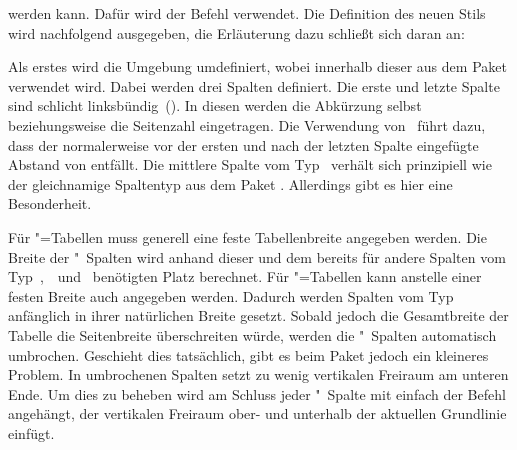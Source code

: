 \documentclass[%
  english,ngerman,%
  geometry=no,DIV=12,automark,%
]{tudscrartcl}
\begin{document}
werden kann. Dafür wird der Befehl  verwendet. Die 
Definition des neuen Stils  wird nachfolgend ausgegeben, 
die Erläuterung dazu schließt sich daran an:
%
\TutorialHook{\let\newglossarystyle\renewglossarystyle}
\begin{Tutorial}
\end{Tutorial}
%
Als erstes wird die Umgebung  umdefiniert, wobei 
innerhalb dieser  aus dem Paket  verwendet 
wird. Dabei werden drei Spalten definiert. Die erste und letzte Spalte sind 
schlicht linksbündig~(). In diesen werden die Abkürzung selbst 
beziehungsweise die Seitenzahl eingetragen. Die Verwendung von~ 
führt dazu, dass der normalerweise vor der ersten und nach der letzten Spalte 
eingefügte Abstand von  entfällt. Die mittlere Spalte vom 
Typ~ verhält sich prinzipiell wie der gleichnamige Spaltentyp aus dem 
Paket . Allerdings gibt es hier eine Besonderheit.

Für "=Tabellen muss generell eine feste Tabellenbreite 
angegeben werden. Die Breite der "~Spalten wird anhand dieser und 
dem bereits für andere Spalten vom Typ~,~~und~ 
benötigten Platz berechnet. Für "=Tabellen kann anstelle 
einer festen Breite auch  angegeben werden. Dadurch werden 
Spalten vom Typ~ anfänglich in ihrer natürlichen Breite gesetzt. 
Sobald jedoch die Gesamtbreite der Tabelle die Seitenbreite überschreiten 
würde, werden die "~Spalten automatisch umbrochen. Geschieht dies 
tatsächlich, gibt es beim Paket  jedoch ein kleineres Problem. 
In umbrochenen Spalten setzt  zu wenig vertikalen Freiraum am 
unteren Ende. Um dies zu beheben wird am Schluss jeder "~Spalte mit
 einfach der Befehl  angehängt, der 
vertikalen Freiraum ober- und unterhalb der aktuellen Grundlinie einfügt.
\end{document}
